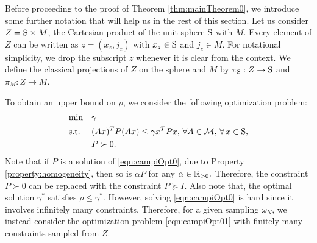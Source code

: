 

Before proceeding to the proof of Theorem \ref{thm:mainTheorem0}, we introduce some further notation that will help us in the rest of this section. Let us consider $Z = \text{S} \times M$, the Cartesian product of the unit sphere $\text{S}$ with $M$. Every element of $Z$ can be written as $z = (x_z, j_z)$ with $x_z \in \text{S}$ and $j_z \in M$. For notational simplicity, we drop the subscript $z$ whenever it is clear from the context. We define the classical projections of $Z$ on the sphere and $M$ by $\pi_{\text{S}}: Z \to \text{S}$ and $\pi_M: Z \to M$.

To obtain an upper bound on $\rho$, we consider the following optimization problem:
\begin{equation}\label{eqn:campiOpt0}
\begin{aligned}
& \text{min} & & \gamma \\
& \text{s.t.} 
&  & (Ax)^TP(Ax) \leq \gamma x^TPx,\,\forall A \in \mathcal{M}, \,\forall\, x \in \text{S},\\
& && P \succ 0. \\
\end{aligned}
\end{equation}
Note that if $P$ is a solution of \eqref{eqn:campiOpt0}, due to Property \ref{property:homogeneity}, then so is $\alpha P$ for any $\alpha \in \mathbb{R}_{> 0}.$ Therefore, the constraint $P \succ 0$ can be replaced with the constraint $P \succeq I$. Also note that, the optimal solution $\gamma^*$ satisfies $\rho \leq \gamma^*$. However, solving \eqref{eqn:campiOpt0} is hard since it involves infinitely many constraints. Therefore, for a given sampling $\omega_N$, we instead consider the optimization problem \eqref{eqn:campiOpt01} with finitely many constraints sampled from $Z$.

